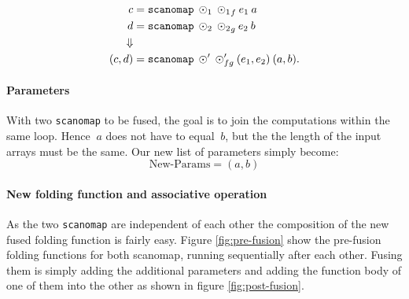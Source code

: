 \documentclass[11pt]{article}
\begin{document}
\begin{align*}
  c &= \mathtt{scanomap} \: \odot_1 \: {\odot_1}_f \: e_1 \: a \\
  d &= \mathtt{scanomap} \: \odot_2 \: {\odot_2}_g \: e_2 \: b \\
\Downarrow \\
  (c,d) &= \mathtt{scanomap} \: \odot' \: \odot'_{fg} \: (e_1, e_2) \: (a, b)\mathnormal{.}
\end{align*}


\paragraph{Parameters} With two \texttt{scanomap} to be fused, the goal is to join the computations within the same loop. Hence $\: a$ does not have to equal $\: b$, but the the length of the input arrays must be the same. Our new list of parameters simply become:
$$\text{New-Params} = (a,b)$$

\paragraph{New folding function and associative operation} As the two \texttt{scanomap} are independent of each other the composition of the new fused folding function is fairly easy. Figure \ref{fig:pre-fusion} show the pre-fusion folding functions for both scanomap, running sequentially after each other. Fusing them is simply adding the additional parameters and adding the function body of one of them into the other as shown in figure \ref{fig:post-fusion}. 
\end{document}
